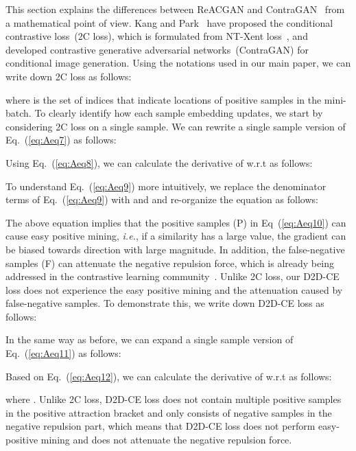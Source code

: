 \documentclass{article}
\begin{document}
\label{difference_reac_contra}
This section explains the differences between ReACGAN and ContraGAN~\cite{kang2020contragan} from a mathematical point of view. Kang and Park~\cite{kang2020contragan} have proposed the conditional contrastive loss~(2C loss), which is formulated from NT-Xent loss~\cite{Chen2020ASF}, and developed contrastive generative adversarial networks~(ContraGAN) for conditional image generation. Using the notations used in our main paper, we can write down 2C loss as follows:


where  is the set of indices that indicate locations of positive samples in the mini-batch. To clearly identify how each sample embedding updates, we start by considering 2C loss on a single sample. We can rewrite a single sample version of Eq.~(\ref{eq:Aeq7}) as follows:


Using Eq.~(\ref{eq:Aeq8}), we can calculate the derivative of  w.r.t  as follows:


To understand Eq.~(\ref{eq:Aeq9}) more intuitively, we replace the denominator terms of Eq.~(\ref{eq:Aeq9}) with  and  and re-organize the equation as follows:

The above equation implies that the positive samples (P) in Eq~(\ref{eq:Aeq10}) can cause easy positive mining, \textit{i.e.}, if a similarity  has a large value, the gradient  can be biased towards  direction with large magnitude. In addition, the false-negative samples (F) can attenuate the negative repulsion force, which is already being addressed in the contrastive learning community~\cite{chuang2020debiased, huynh2020boosting, robinson2020contrastive}. Unlike 2C loss, our D2D-CE loss does not experience the easy positive mining and the attenuation caused by false-negative samples. To demonstrate this, we write down D2D-CE loss as follows:



In the same way as before, we can expand a single sample version of Eq.~(\ref{eq:Aeq11}) as follows:

Based on Eq.~(\ref{eq:Aeq12}), we can calculate the derivative of  w.r.t  as follows:



where . Unlike 2C loss, D2D-CE loss does not contain multiple positive samples in the positive attraction bracket and only consists of negative samples in the negative repulsion part, which means that D2D-CE loss does not perform easy-positive mining and does not attenuate the negative repulsion force. 
\end{document}
